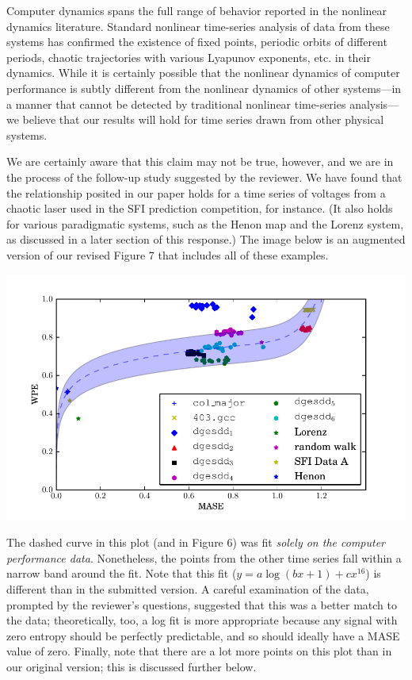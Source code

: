 \documentclass[12pt]{article}
\begin{document}
Computer dynamics spans the full range of behavior reported in the
nonlinear dynamics literature.  Standard nonlinear time-series
analysis of data from these systems has confirmed the existence of
fixed points, periodic orbits of different periods, chaotic
trajectories with various Lyapunov exponents, etc.  in their dynamics.
While it is certainly possible that the nonlinear dynamics of computer
performance is subtly different from the nonlinear dynamics of other
systems---in a manner that cannot be detected by traditional nonlinear
time-series analysis---we believe that our results will hold for time
series drawn from other physical systems.

We are certainly aware that this claim may not be true, however, and
we are in the process of the follow-up study suggested by the
reviewer.  We have found that the relationship posited in our paper
holds for a time series of voltages from a chaotic laser used in the
SFI prediction competition, for instance.  (It also holds for various
paradigmatic systems, such as the Henon map and the Lorenz system, as
discussed in a later section of this response.)  The image below is an
augmented version of our revised Figure 7 that includes all of these
examples.

\begin{center}
    \includegraphics[width=0.8\columnwidth]{figs/new_prediction_vs_entropy_extras}
\end{center}

\noindent The dashed curve in this plot (and in Figure 6) was fit
\emph{solely on the computer performance data}.  Nonetheless, the
points from the other time series fall within a narrow band around the
fit.  Note that this fit ($y = a \log(b x + 1) + c x^16$) is different than in
the submitted version.  A careful examination of the data, prompted by
the reviewer's questions, suggested that this was a better match to
the data; theoretically, too, a log fit is more appropriate because
any signal with zero entropy should be perfectly predictable, and so
should ideally have a MASE value of zero.  Finally, note that there
are a lot more points on this plot than in our original version; this
is discussed further below.
\end{document}
